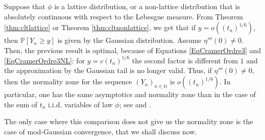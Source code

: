 \documentclass[12pt,a4paper,reqno]{amsart}
\theoremstyle{remark}
\newcommand{\N}{\mathbb{N}}
\newcommand{\proba}{\mathbb{P}}
\begin{document}
Suppose that $\phi$ is a lattice distribution, or a non-lattice distribution that is absolutely continuous with respect to the Lebesgue measure. From Theorem \ref{thm:cltlattice} or Theorem \ref{thm:cltnonlattice}, we get that if $y=o((t_n)^{1/6})$, then $\proba[Y_n \geq y]$ is given by the Gaussian distribution. Assume $\eta'''(0) \neq 0$. Then, the previous result is optimal, because
of Equations \eqref{EqCramerOrdre3} and \eqref{EqCramerOrdre3NL}: for $y=c (t_n)^{1/6}$ the second factor is different from $1$ and the approximation by the  Gaussian tail is no longer valid. Thus, if $\eta'''(0)\neq 0$, then the normality zone for the sequence $(Y_n)_{n \in \N}$ is $o((t_n)^{1/6})$. 
In particular, one has the same asymptotics and normality zone than in the case of the sum of $t_n$ i.i.d. variables of law $\phi$; see \cite{Cramer38} and \cite{Petrov54}.
\bigskip


The only case where this comparison does not give us the normality zone is 
the case of mod-Gaussian convergence, that we shall discuss now. 
\medskip
\end{document}
